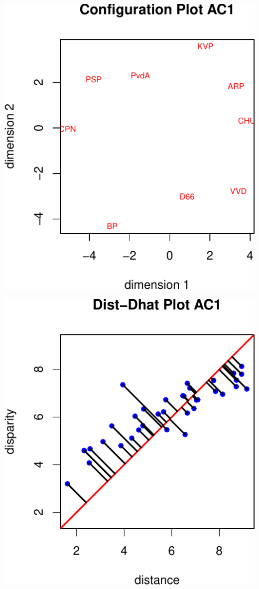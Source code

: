 \documentclass[
  12pt,
]{article}
\begin{document}
\begin{center}\includegraphics{smacofAC_files/figure-latex/gruijterh00-2} \end{center}

\begin{center}\includegraphics{smacofAC_files/figure-latex/gruijterh00-3} \end{center}
\end{document}
